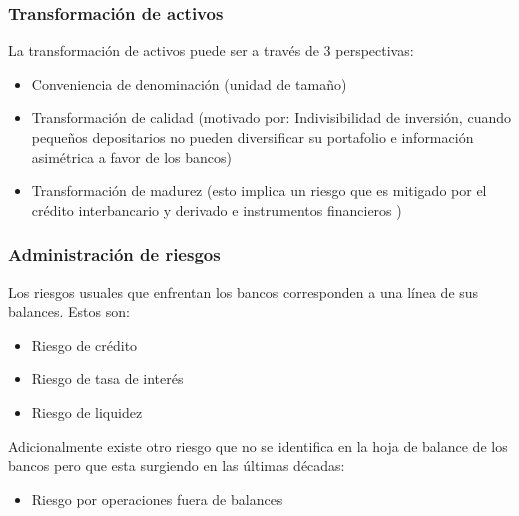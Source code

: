 \begin{frame}
    \frametitle{{\normalsize Transformación de activos} {}}
    La transformación de activos puede ser a través de 3 perspectivas:
    \begin{itemize}
        \item Conveniencia de denominación (unidad de tamaño)
        \item Transformación de calidad (motivado por: Indivisibilidad de inversión, cuando pequeños depositarios no pueden diversificar su portafolio e información asimétrica a favor de los bancos)
        \item Transformación de madurez (esto implica un riesgo que es mitigado por el crédito interbancario y derivado e instrumentos financieros )
     \end{itemize}
\end{frame}
	
    \begin{frame}
        \frametitle{{\normalsize Administración de riesgos} {}}
     Los riesgos usuales que enfrentan los bancos corresponden a una línea de sus balances. Estos son:
     \begin{itemize}
         \item Riesgo de crédito
         \item Riesgo de tasa de interés
         \item Riesgo de liquidez
     \end{itemize}
     Adicionalmente existe otro riesgo que no se identifica en la hoja de balance de los bancos pero que esta surgiendo en las últimas décadas:
     \begin{itemize}
         \item Riesgo por operaciones fuera de balances
     \end{itemize}
\end{frame}
    
